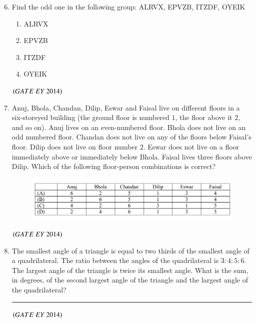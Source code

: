 \documentclass[journal]{IEEEtran}
\numberwithin{equation}{enumi}
\numberwithin{figure}{enumi}
\begin{document}
\begin{enumerate}
\setcounter{enumi}{5}
    \item Find the odd one in the following group: ALRVX, EPVZB, ITZDF, OYEIK
    \begin{multicols}{4}
    \begin{enumerate}
        \item ALRVX
        \item EPVZB
        \item ITZDF
        \item OYEIK
    \end{enumerate}
    \end{multicols}
    \hfill{$\brak{ GATE\ EY\ 2014}$}
    \bigskip

    \item Anuj, Bhola, Chandan, Dilip, Eswar and Faisal live on different floors in a six-storeyed building (the ground floor is numbered $1$, the floor above it $2$, and so on). Anuj lives on an even-numbered floor. Bhola does not live on an odd numbered floor. Chandan does not live on any of the floors below Faisal's floor. Dilip does not live on floor number $2$. Eswar does not live on a floor immediately above or immediately below Bhola. Faisal lives three floors above Dilip. Which of the following floor-person combinations is correct?
    \newline
    \begin{figure}[H]
    \centering
    \includegraphics[width=0.8\columnwidth]{figs/1.png}
    \caption{}
    \label{fig:1}
   \end{figure}
    \hfill{$\brak{ GATE\ EY\ 2014}$}
    \bigskip

    \item The smallest angle of a triangle is equal to two thirds of the smallest angle of a quadrilateral. The ratio between the angles of the quadrilateral is $3:4:5:6$. The largest angle of the triangle is twice its smallest angle. What is the sum, in degrees, of the second largest angle of the triangle and the largest angle of the quadrilateral? \rule{3cm}{0.15mm}
    \hfill{$\brak{ GATE\ EY\ 2014}$}
    \bigskip


\end{enumerate}
\end{document}
